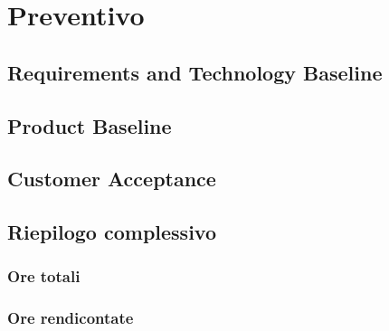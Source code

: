 \section{Preventivo} \label{section:preventivo}

\subsection{Requirements and Technology Baseline} \label{subsection:preventivo_rtb}


\subsection{Product Baseline} \label{subsection:preventivo_pb}


\subsection{Customer Acceptance} \label{subsection:preventivo_ca}


\subsection{Riepilogo complessivo}
\subsubsection{Ore totali}
\subsubsection{Ore rendicontate}